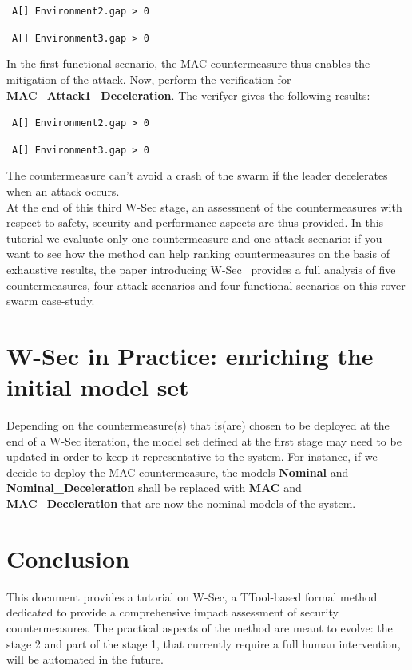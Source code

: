 \documentclass{article}
\newcommand{\cmark}{\textcolor{green}{\textbf{\ding{51}}}}
\newcommand{\xmark}{\textcolor{red}{\textbf{\ding{55}}}}
\begin{document}
\cmark~\verb|A[] Environment2.gap > 0|

\cmark~\verb|A[] Environment3.gap > 0|

In the first functional scenario, the MAC countermeasure thus enables the mitigation of the attack. Now, perform the verification for \textbf{MAC\_Attack1\_Deceleration}. The verifyer gives the following results:

\xmark~\verb|A[] Environment2.gap > 0|

\xmark~\verb|A[] Environment3.gap > 0|

The countermeasure can't avoid a crash of the swarm if the leader decelerates when an attack occurs.\\

At the end of this third W-Sec stage, an assessment of the countermeasures with respect to safety, security and performance aspects are thus provided. In this tutorial we evaluate only one countermeasure and one attack scenario: if you want to see how the method can help ranking countermeasures on the basis of exhaustive results, the paper introducing W-Sec~\cite{wsec} provides a full analysis of five countermeasures, four attack scenarios and four functional scenarios on this rover swarm case-study.



\section{W-Sec in Practice: enriching the initial model set}

Depending on the countermeasure(s) that is(are) chosen to be deployed at the end of a W-Sec iteration, the model set defined at the first stage may need to be updated in order to keep it representative to the system. For instance, if we decide to deploy the MAC countermeasure, the models \textbf{Nominal} and \textbf{Nominal\_Deceleration} shall be replaced with \textbf{MAC} and \textbf{MAC\_Deceleration} that are now the nominal models of the system.



\section{Conclusion}

This document provides a tutorial on W-Sec, a TTool-based formal method dedicated to provide a comprehensive impact assessment of security countermeasures. The practical aspects of the method are meant to evolve: the stage 2 and part of the stage 1, that currently require a full human intervention, will be automated in the future.





\end{document}

